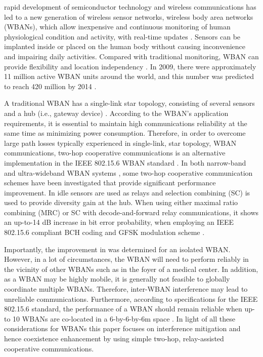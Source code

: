 \documentclass[12pt,draftcls,a4paper,onecolumn,journal]{IEEEtran}
\begin{document}
 rapid development of semiconductor technology and wireless communications has led to a new generation of wireless sensor networks, wireless body area networks (WBANs), which allow inexpensive and continuous monitoring of human physiological condition and activity, with real-time updates \cite{Astrin2007}. Sensors can be implanted inside or placed on the human body without causing inconvenience and impairing daily activities. Compared with traditional monitoring, WBAN can provide flexibility and location independency \cite{Lewis2008}. In 2009, there were approximately 11 million active WBAN units around the world, and this number was predicted to reach 420 million by 2014 \cite{ABIResearch}.



A traditional WBAN has a single-link star topology, consisting of several sensors and a hub (i.e., gateway device) \cite{tg6_d}. According to the WBAN’s application requirements, it is essential to maintain high communications reliability at the same time as minimizing power consumption. Therefore, in order to overcome large path losses typically experienced in single-link, star topology, WBAN communications, two-hop cooperative communications is an alternative implementation in the IEEE 802.15.6 WBAN standard \cite{tg6_d}. In both narrow-band \cite{Dong2011,SMITH:WCNC:2012,Ferrand:AT:2011,Dong2012,Dong:ICC:2013} and ultra-wideband WBAN systems \cite{Chen09JSAC}, some two-hop cooperative communication schemes have been investigated that provide significant performance improvement. In \cite{Dong2012} idle sensors are used as relays and selection combining (SC) is used to provide diversity gain at the hub. When using either maximal ratio combining (MRC) or SC with decode-and-forward relay communications, it shows an up-to-14 dB increase in  bit error probability, when employing an IEEE 802.15.6 compliant BCH coding and GFSK modulation scheme \cite{Dong2011}.

Importantly, the improvement in \cite{Dong2011} was determined for an isolated WBAN. However, in a lot of circumstances, the WBAN will need to perform reliably in the vicinity of other WBANs such as in the foyer of a medical center. In addition, as a WBAN may be highly mobile, it is generally not feasible to globally coordinate multiple WBANs\cite{Kim2012}. Therefore, inter-WBAN interference may lead to unreliable communications. Furthermore, according to specifications for the IEEE 802.15.6 standard, the performance of a WBAN should remain reliable when up-to 10 WBANs are co-located in a 6-by-6-by-6m space \cite{TRD}. In light of all these considerations for WBANs this paper focuses on interference mitigation and hence coexistence enhancement by using simple two-hop, relay-assisted cooperative communications.
\end{document}
